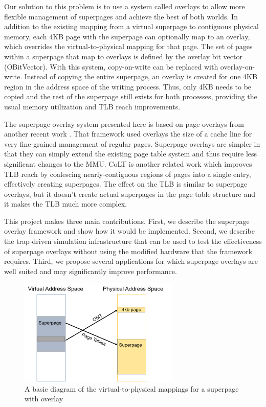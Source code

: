 Our solution to this problem is to use a system called overlays to allow more flexible management of superpages and achieve the best of both worlds. In addition to the existing mapping from a virtual superpage to contiguous physical memory, each 4KB page with the superpage can optionally map to an overlay, which overrides the virtual-to-physical mapping for that page. The set of pages within a superpage that map to overlays is defined by the overlay bit vector (OBitVector). With this system, copy-on-write can be replaced with overlay-on-write. Instead of copying the entire superpage, an overlay is created for one 4KB region in the address space of the writing process. Thus, only 4KB needs to be copied and the rest of the superpage still exists for both processes, providing the usual memory utilization and TLB reach improvements.

The superpage overlay system presented here is based on page overlays from another recent work \cite{Seshadri}. That framework used overlays the size of a cache line for very fine-grained management of regular pages. Superpage overlays are simpler in that they can simply extend the existing page table system and thus require less significant changes to the MMU. CoLT \cite{Pham} is another related work which improves TLB reach by coalescing nearly-contiguous regions of pages into a single entry, effectively creating superpages. The effect on the TLB is similar to superpage overlays, but it doesn't create actual superpages in the page table structure and it makes the TLB much more complex.

This project makes three main contributions. First, we describe the superpage overlay framework and show how it would be implemented. Second, we describe the trap-driven simulation infrastructure that can be used to test the effectiveness of superpage overlays without using the modified hardware that the framework requires. Third, we propose several applications for which superpage overlays are well suited and may significantly improve performance.

\begin{figure}
    \centering
    \includegraphics[width=3in]{Figures/Picture1}
    \caption{A basic diagram of the virtual-to-physical mappings for a superpage with overlay}
    \label{fig:basic}
\end{figure}
